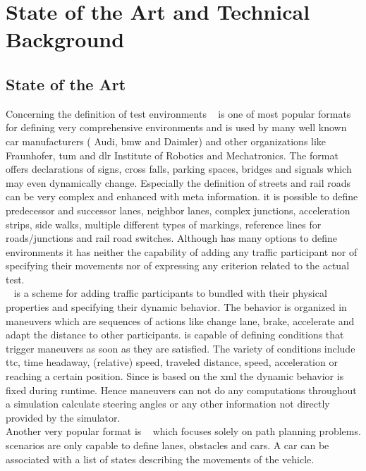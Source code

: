 \section{State of the Art and Technical Background}\label{sec:sota}
\subsection{State of the Art}
Concerning the definition of test environments \opendrive{}~\cite{openDrive} is one of most popular formats for defining very comprehensive environments and is used by many well known car manufacturers (\eg{} Audi, \gls{bmw} and Daimler) and other organizations like Fraunhofer, \gls{tum} and \gls{dlr} Institute of Robotics and Mechatronics.
The format offers declarations of signs, cross falls, parking spaces, bridges and signals which may even dynamically change.
Especially the definition of streets and rail roads can be very complex and enhanced with meta information.
\Eg{} it is possible to define predecessor and successor lanes, neighbor lanes, complex junctions, acceleration strips, side walks, multiple different types of markings, reference lines for roads/junctions and rail road switches.
Although \opendrive{} has many options to define environments it has neither the capability of adding any traffic participant nor of specifying their movements nor of expressing any criterion related to the actual test.\\
\openscenario{}~\cite{openScenario} is a scheme for adding traffic participants to \opendrive{} bundled with their physical properties and specifying their dynamic behavior.
The behavior is organized in maneuvers which are sequences of actions like change lane, brake, accelerate and adapt the distance to other participants.
\openscenario{} is capable of defining conditions that trigger maneuvers as soon as they are satisfied.
The variety of conditions include \gls{ttc}, time headaway, (relative) speed, traveled distance, speed, acceleration or reaching a certain position.
Since \openscenario{} is based on the \gls{xml} the dynamic behavior is fixed during runtime.
Hence maneuvers can not do any computations throughout a simulation \eg{} calculate steering angles or any other information not directly provided by the simulator.\\
Another very popular format is \commonroad{}~\cite{commonRoad} which focuses solely on path planning problems.
\commonroad{} scenarios are only capable to define lanes, obstacles and cars.
A car can be associated with a list of states describing the movements of the vehicle.
